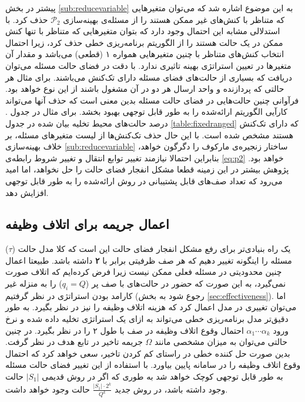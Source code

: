 پیشتر در بخش \ref{sub:reducevariable} به این موضوع اشاره شد که می‌توان متغیرهایی که متناظر با کنش‌های غیر ممکن هستند را از مسئله‌ی بهینه‌سازی 
 $\mathcal{P}_2$
 حذف کرد. با استدلالی مشابه این احتمال وجود دارد که بتوان متغیرهایی که متناظر با تنها کنش ممکن در یک حالت هستند را از الگوریتم برنامه‌ریزی خطی حذف کرد، زیرا احتمال انتخاب کنش‌های متناظر با چنین متغیرهایی همواره ۱ (قطعی) می‌باشد و مقدار آن متغیرها در تعیین استراتژی بهینه تاثیری ندارد. با دقت در فضای حالت مسئله می‌توان دریافت که بسیاری از حالت‌های فضای مسئله دارای تک‌کنش می‌باشند. برای مثال هر حالتی که پردازنده و واحد ارسال هر دو در آن مشغول باشند از این نوع خواهد بود. فرآوانی چنین حالت‌هایی در فضای حالت مسئله بدین معنی است که حذف آنها می‌تواند کارآیی الگوریتم ارائه‌شده را به طور قابل توجهی بهبود بخشد. برای مثال در جدول . درصد حالت‌های محیط تخلیه بیان شده در جدول \ref{table:fixedranged} که دارای تک‌کنش هستند مشخص شده است. با این حال حذف تک‌کنش‌ها از لیست متغیرهای مسئله، بر خلاف بهینه‌سازی \ref{sub:reducevariable} ساختار زنجیره‌ی مارکوف را دگرگون خواهد، بنابراین احتمالا نیازمند تغییر توابع انتقال و تغییر شروط رابطه‌ی \ref{eq:p2} خواهد بود. پژوهش بیشتر در این زمینه قطعا مشکل انفجار فضای حالت را حل نخواهد، اما امید می‌رود که تعداد صف‌های قابل پشتیبانی در روش ارائه‌شده را به طور قابل توجهی افزایش دهد.

\subsection{اعمال جریمه برای اتلاف وظیفه}
یک راه بنیادی‌تر برای رفع مشکل انفجار فضای حالت این است که کلا مدل حالت ($\tau$) مسئله را اینگونه تغییر دهیم که هر صف ظرفیتی برابر با \textbf{۲} داشته باشد. طبیعتا اعمال چنین محدودیتی در مسئله فعلی ممکن نیست زیرا فرض کرده‌ایم که اتلاف صورت نمی‌گیرد، به این صورت که حضور در حالت‌های با صف پر ($q_i = Q$) را به منزله غیر کارامد بودن استراتژی در نظر گرفتیم (رجوع شود به بخش \ref{sec:effectiveness}). اما می‌توان تغییری در مدل اعمال کرد که هزینه اتلاف وظیفه را نیز در نظر بگیرد. به طور دقیق‌تر مدل برنامه‌ریزی خطی می‌تواند به ازای یک استراتژی تخلیه داده شده و نرخ ورود $\alpha_1 \cdots \alpha_k$ احتمال وقوع اتلاف وظیفه در صف با طول ۲ را در نظر بگیرد. در چنین حالتی می‌توان به میزان مشخصی مانند $\Omega$ جریمه تاخیر در تابع هدف در نظر گرفت. بدین صورت حل کننده خطی در راستای کم کردن تاخیر، سعی خواهد کرد که احتمال وقوع اتلاف وظیفه را در سامانه پایین بیاورد. با استفاده از این تغییر فضای حالت مسئله به طور قابل توجهی کوچک خواهد شد به طوری که اگر در روش قدیمی $|S_1|$ حالت وجود داشته باشد، در روش جدید 
$\frac{|S_1| \cdot 2^k}{Q^k}$ 
حالت وجود خواهد داشت.
